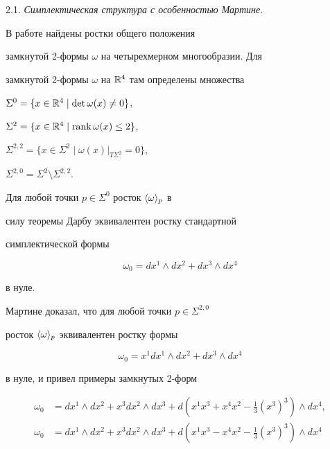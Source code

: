 2.1. {\it Симплектическая структура с особенностью Мартине.}


В работе \cite{Mart} найдены ростки общего положения


замкнутой 2-формы $\omega$ на четырехмерном многообразии. Для


замкнутой 2-формы $\omega$ на ${\Bbb R}^4$ там определены множества


$\Sigma^0=\{x \in {\Bbb R}^4 \mid \det\omega(x) \ne 0\}$,


$\Sigma^2=\{x \in {\Bbb R}^4 \mid \operatorname{rank} \omega(x) \le 2\}$,


$\Sigma^{2,2} =\{x \in \Sigma^2 \mid


\omega(x)\big|_{T\Sigma^2}=0\}$,


$\Sigma^{2,0} = \Sigma^2 \setminus \Sigma^{2,2}$.





Для любой точки $p \in \Sigma^0$ росток $\langle \omega \rangle_{p}$ в


силу теоремы Дарбу эквивалентен ростку стандартной


симплектической формы


\begin{equation} \label{eq2}


\omega_0 = dx^1 \wedge dx^2 + dx^3 \wedge dx^4


\end{equation}


в нуле.





Мартине \cite{Mart} доказал, что для любой точки $p \in \Sigma^{2,0}$ 


росток $\langle \omega \rangle_{p}$ эквивалентен ростку формы


\begin{equation} \label{eq3}


\omega_0 = x^1 dx^1 \wedge dx^2 + dx^3 \wedge dx^4


\end{equation}


в нуле, и привел примеры замкнутых 2-форм 


\begin{align}\label{eq4}


\omega_0 &= dx^1 \wedge dx^2 + x^3 dx^2 \wedge dx^3


+ d(x^1 x^3 + x^4 x^2 - \tfrac{1}{3}(x^3)^3)\wedge dx^4, \\


%


\label{eq5}


\omega_0 &= dx^1 \wedge dx^2 + x^3 dx^2 \wedge dx^3


+ d(x^1 x^3 - x^4 x^2 - \tfrac{1}{3}(x^3)^3)\wedge dx^4


\end{align}


